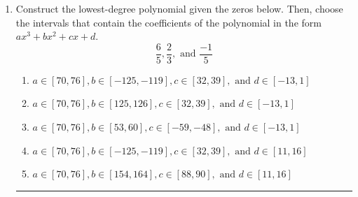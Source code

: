\documentclass[14pt]{extbook}
\newcommand{\litem}[1]{\item#1\hspace*{-1cm}\rule{\textwidth}{0.4pt}}
\begin{document}
\begin{enumerate}
{\begin{enumerate}[label=\Alph*.]
\end{enumerate} }
\litem{
Construct the lowest-degree polynomial given the zeros below. Then, choose the intervals that contain the coefficients of the polynomial in the form $ax^3+bx^2+cx+d$.\[ \frac{6}{5}, \frac{2}{3}, \text{ and } \frac{-1}{5} \]\begin{enumerate}[label=\Alph*.]
\item \( a \in [70, 76], b \in [-125, -119], c \in [32, 39], \text{ and } d \in [-13, 1] \)
\item \( a \in [70, 76], b \in [125, 126], c \in [32, 39], \text{ and } d \in [-13, 1] \)
\item \( a \in [70, 76], b \in [53, 60], c \in [-59, -48], \text{ and } d \in [-13, 1] \)
\item \( a \in [70, 76], b \in [-125, -119], c \in [32, 39], \text{ and } d \in [11, 16] \)
\item \( a \in [70, 76], b \in [154, 164], c \in [88, 90], \text{ and } d \in [11, 16] \)

\end{enumerate} }
\end{enumerate}
\end{document}
